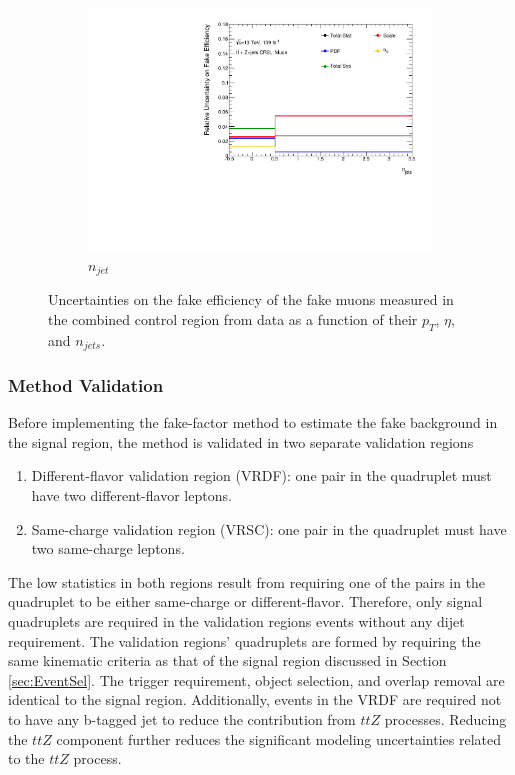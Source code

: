 \begin{figure}[htb]
\begin{center}
\begin{subfigure}{.48\textwidth}
        \includegraphics[width=.95\linewidth]{figures/Analysis/Background/SystematicUncertainties3D_Muon_njet.pdf}
        \caption{$n_{jet}$ \label{fig:FakeUnc_njet_mu}}
    \end{subfigure}
    \end{center}
\caption{Uncertainties on the fake efficiency of the fake muons measured in the combined control region from data as a function of their $p_{T}$, $\eta$, and $n_{jets}$. \label{fig:FakeEffUnc_3D_Muon}}
\end{figure}

\subsubsection{Method Validation}
\label{subsubsec:Validation}
Before implementing the fake-factor method to estimate the fake background in the signal region, the method is validated in two separate validation regions
\begin{enumerate}
    \item{ Different-flavor validation region (VRDF): one pair in the quadruplet must have two different-flavor leptons.}
    \item{ Same-charge validation region (VRSC): one pair in the quadruplet must have two same-charge leptons.}
\end{enumerate}

The low statistics in both regions result from requiring one of the pairs in the quadruplet to be either same-charge or different-flavor. Therefore, only signal quadruplets are required in the validation regions events without any dijet requirement. The validation regions' quadruplets are formed by requiring the same kinematic criteria as that of the signal region discussed in Section \ref{sec:EventSel}. The trigger requirement, object selection, and overlap removal are identical to the signal region. Additionally, events in the VRDF are required not to have any b-tagged jet to reduce the contribution from $ttZ$ processes. Reducing the $ttZ$ component further reduces the significant modeling uncertainties related to the $ttZ$ process.

